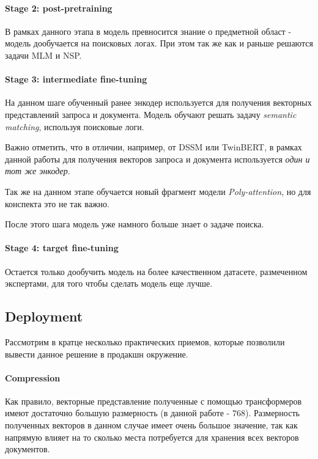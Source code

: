 \paragraph{Stage 2: post-pretraining} В рамках данного этапа в модель превносится знание о предметной област - модель дообучается на поисковых логах. 
При этом так же как и раньше решаются задачи MLM и NSP.

\paragraph{Stage 3: intermediate fine-tuning} На данном шаге обученный ранее энкодер используется для получения векторных представлений запроса и документа.
Модель обучают решать задачу \textit{semantic matching}, используя поисковые логи.

Важно отметить, что в отличии, например, от DSSM или TwinBERT, в рамках данной работы для получения векторов запроса и документа используется \textit{один и тот же энкодер}.

Так же на данном этапе обучается новый фрагмент модели \textit{Poly-attention}, но для конспекта это не так важно.

После этого шага модель уже намного больше знает о задаче поиска.

\paragraph{Stage 4: target fine-tuning} Остается только дообучить модель на более качественном датасете, размеченном экспертами, для того чтобы сделать модель еще лучше.

\subsection*{Deployment}

Рассмотрим в кратце несколько практических приемов, которые позволили вывести данное решение в продакшн окружение.

\paragraph{Compression} Как правило, векторные представление полученные с помощью трансформеров имеют достаточно большую размерность (в данной работе - $768$).
Размерность полученных векторов в данном случае имеет очень большое значение, так как напрямую влияет на то сколько места потребуется для хранения всех векторов документов. \\

